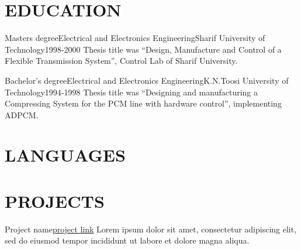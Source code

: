 \documentclass[10pt, a4paper]{article}
\begin{document}
\section{EDUCATION}

\begin{cvitem}{Masters degree}{Electrical and Electronics Engineering}{Sharif University of Technology}{1998-2000}
    Thesis title was “Design, Manufacture and Control of a Flexible Transmission System”, Control Lab of Sharif University.
\end{cvitem}

\begin{cvitem}{Bachelor's degree}{Electrical and Electronics Engineering}{K.N.Toosi University of Technology}{1994-1998}
    Thesis title was “Designing and manufacturing a Compressing System for the PCM line with hardware control”, implementing ADPCM.
\end{cvitem}

\section{LANGUAGES}

\begin{langs}
     
\end{langs}

\cefrdesc %

\section{PROJECTS}


\begin{projitem}{Project name}{\href{https://link}{project link}}
    Lorem ipsum dolor sit amet, consectetur adipiscing elit, sed do eiusmod tempor incididunt ut labore et dolore magna aliqua.
\end{projitem}


\fincols
\end{document}
